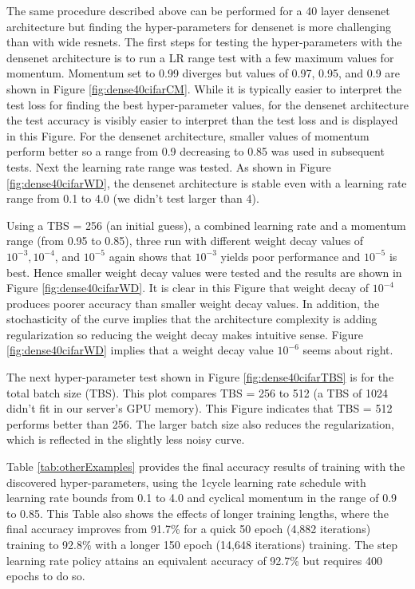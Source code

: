 \documentclass{article} %
\begin{document}
The same procedure described above can be performed for a 40 layer densenet architecture but finding the hyper-parameters for densenet is more challenging  than with wide resnets.  The first steps for testing the hyper-parameters with the densenet architecture is to run a LR range test with a few maximum values for momentum.  Momentum set to 0.99 diverges but values of 0.97, 0.95, and 0.9 are shown in Figure \ref{fig:dense40cifarCM}.     While it is typically easier to interpret the test loss for finding the best hyper-parameter values, for the densenet architecture the test accuracy is  visibly easier to interpret  than the test loss and is displayed in this Figure.   For the densenet architecture, smaller values of momentum perform better so a range from 0.9 decreasing to 0.85 was used in subsequent tests.  Next the learning rate range was tested.  As shown in Figure \ref{fig:dense40cifarWD}, the densenet architecture is stable even with a learning rate range from 0.1 to 4.0 (we didn't test larger than 4).  

Using a TBS = 256 (an initial guess), a combined  learning rate and a momentum range (from 0.95 to 0.85), three run with different weight decay values of $10^{-3}, 10^{-4}$, and $10^{-5}$ again shows that $10^{-3}$ yields poor performance and $10^{-5}$ is best.  Hence smaller weight decay values were tested and the results are shown in Figure \ref{fig:dense40cifarWD}.  It is clear in this Figure that weight decay of $10^{-4}$ produces poorer accuracy than smaller weight decay values.  In addition, the stochasticity of the curve implies that the architecture complexity is adding regularization so reducing the weight decay makes intuitive sense.  Figure \ref{fig:dense40cifarWD} implies that a weight decay value $10^{-6}$ seems about right.

The next hyper-parameter test shown in Figure \ref{fig:dense40cifarTBS} is for the total batch size (TBS).  This plot compares TBS = 256 to 512 (a TBS of 1024 didn't fit in our server's GPU memory).  This Figure indicates that TBS = 512 performs better than 256.  The larger batch size also reduces the regularization, which is reflected in the slightly less noisy curve.  

Table \ref{tab:otherExamples} provides the final accuracy results of training with the discovered hyper-parameters, using the 1cycle learning rate schedule with learning rate bounds from 0.1 to 4.0 and cyclical momentum in the range of 0.9 to 0.85.  This Table also shows the effects of longer training lengths, where the final accuracy improves from 91.7\% for a quick 50 epoch (4,882 iterations) training to 92.8\% with a longer 150 epoch (14,648 iterations) training.  The step learning rate policy attains an equivalent accuracy of 92.7\% but requires 400 epochs to do so.
\end{document}
